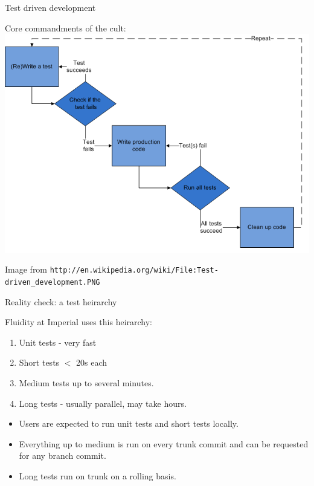 \documentclass[t]{beamer}
\def\url#1{\texttt{#1}}\fi
\begin{document}
\begin{frame}{Test driven development}
  
  Core commandments of the cult:
  \includegraphics[height=.8\textheight]{Test-driven_development.PNG} 
  
  \tiny Image from \url{http://en.wikipedia.org/wiki/File:Test-driven_development.PNG}
\end{frame}

\begin{frame}{Reality check: a test heirarchy}

  Fluidity at Imperial uses this heirarchy:

  \begin{enumerate}
  \item Unit tests - very fast
  \item Short tests $<$ 20s each
  \item Medium tests up to several minutes.
  \item Long tests - usually parallel, may take hours.
  \end{enumerate}
  
  \begin{itemize}
  \item  Users are expected to run unit tests and short tests locally.
  \item  Everything up to medium is run on every trunk commit and can be requested
  for any branch commit.
  \item Long tests run on trunk on a rolling basis.
  \end{itemize}
  
\end{frame}
\end{document}
